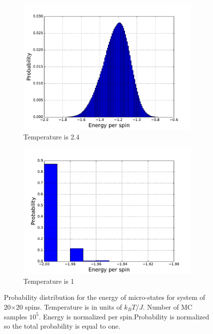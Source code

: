 \documentclass[a4paper]{article}
\begin{document}
\begin{figure}[t!] 
  \begin{subfigure}[t]{0.5\linewidth}
    \centering
    \includegraphics[width=1.0\linewidth]{Energy_pdf_20_24} 
    \caption{Temperature is 2.4} 
    \label{fig2:a} 
  \end{subfigure}
  \begin{subfigure}[t]{0.5\linewidth}
    \centering
    \includegraphics[width=1.0\linewidth]{Energy_pdf_20_T_1} 
    \caption{Temperature is 1} 
    \label{fig2:b} 
  \end{subfigure} 
  \caption{ Probability distribution for the energy of micro-states for system of 20$\times$20 spins. Temperature is in units of $k_BT/J$. Number of MC samples $10^5$. Energy is normalized per spin.Probability is normalized so the total probability is equal to one.   }
  \label{fig2} 
\end{figure}
\end{document}
